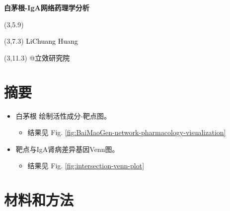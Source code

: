 \documentclass[
]{article}
\author{}
\date{\vspace{-2.5em}}
\providecommand{\tightlist}{%
  \setlength{\itemsep}{0pt}\setlength{\parskip}{0pt}}
\begin{document}
\begin{titlepage} 
\begin{center} \textbf{\Huge
白茅根-IgA网络药理学分析} \vspace{4em}
\begin{textblock}{10}(3,5.9) \huge
\textbf{\textcolor{white}{2023-12-08}}
\end{textblock} \begin{textblock}{10}(3,7.3)
\Large \textcolor{black}{LiChuang Huang}
\end{textblock} \begin{textblock}{10}(3,11.3)
\Large \textcolor{black}{@立效研究院}
\end{textblock} \end{center} \end{titlepage}
\restoregeometry


\tableofcontents

\listoffigures

\listoftables

\newpage


\hypertarget{abstract}{%
\section{摘要}\label{abstract}}

\begin{itemize}
\tightlist
\item
  白茅根 绘制活性成分-靶点图。

  \begin{itemize}
  \tightlist
  \item
    结果见 Fig. \ref{fig:BaiMaoGen-network-pharmacology-visualization}
  \end{itemize}
\item
  靶点与IgA肾病差异基因Venn图。

  \begin{itemize}
  \tightlist
  \item
    结果见 Fig. \ref{fig:intersection-venn-plot}
  \end{itemize}
\end{itemize}

\hypertarget{methods}{%
\section{材料和方法}\label{methods}}
\end{document}
